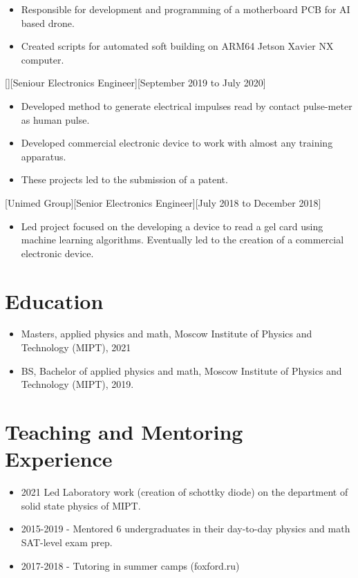 \documentclass{article}
\begin{document}
\begin{itemize}
\item Responsible for development and programming of a motherboard PCB for AI based drone.
\item Created scripts for automated soft building on ARM64 Jetson Xavier NX computer.
\end{itemize}
 
 
[][Seniour Electronics Engineer][September 2019 to July 2020]
 
\begin{itemize}
\item Developed method to generate electrical impulses read by contact pulse-meter as human pulse.
\item Developed commercial electronic device to work with almost any training apparatus.
\item These projects led to the submission of a patent.
\end{itemize}
 
[Unimed Group][Senior Electronics Engineer][July 2018 to December 2018]
 
\begin{itemize}
\item Led project focused on the developing a device to read a gel card using machine learning algorithms. Eventually led to the creation of a commercial electronic device.
\end{itemize}
 
 
\section{Education}
 
\begin{itemize}
\item Masters, applied physics and math, Moscow Institute of Physics and Technology (MIPT), 2021
\item BS, Bachelor of applied physics and math, Moscow Institute of Physics and Technology (MIPT), 2019.
\end{itemize}
 
\section{Teaching and Mentoring Experience }
\begin{itemize}
\item 2021 Led Laboratory work (creation of schottky diode) on the department of solid state physics of MIPT. 
\item 2015-2019 - Mentored 6 undergraduates in their day-to-day physics and math SAT-level exam prep.
\item 2017-2018 - Tutoring in summer camps (foxford.ru)
\end{itemize}
 
\end{document}
